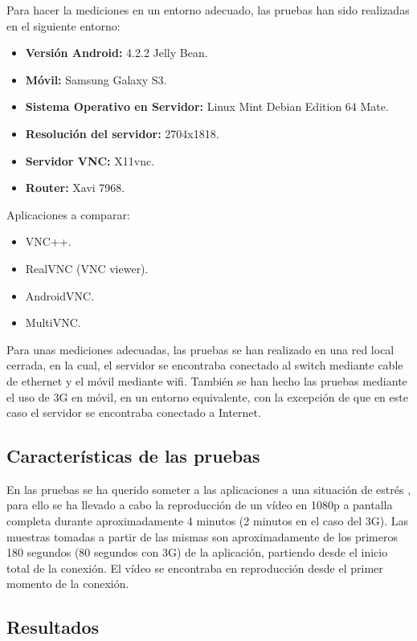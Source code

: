 Para hacer la mediciones en un entorno adecuado, las pruebas han sido realizadas en el siguiente entorno:
\begin{itemize}
\item \textbf{Versión Android:} 4.2.2 Jelly Bean.
\item \textbf{Móvil:} Samsung Galaxy S3.
\item \textbf{Sistema Operativo en Servidor:} Linux Mint Debian Edition 64 Mate.
\item \textbf{Resolución del servidor:} 2704x1818.
\item \textbf{Servidor VNC:} X11vnc.
\item \textbf{Router:} Xavi 7968.
\end{itemize}

Aplicaciones a comparar:
\begin{itemize}
\item VNC++.
\item RealVNC (VNC viewer).
\item AndroidVNC.
\item MultiVNC.
\end{itemize}

Para unas mediciones adecuadas, las pruebas se han realizado en una red local cerrada, en la cual, el servidor se encontraba conectado al switch mediante cable de ethernet y el móvil mediante wifi. También se han hecho las pruebas mediante el uso de 3G en móvil, en un entorno equivalente, con la excepción de que en este caso el servidor se encontraba conectado a Internet.

\subsection{Características de las pruebas}

En las pruebas se ha querido someter a las aplicaciones a una situación de estrés , para ello se ha llevado a cabo la reproducción de un vídeo en 1080p a pantalla completa durante aproximadamente 4 minutos (2 minutos en el caso del 3G). Las muestras tomadas a partir de las mismas son aproximadamente de los primeros 180 segundos (80 segundos con 3G) de la aplicación, partiendo desde el inicio total de la conexión. El vídeo se encontraba en reproducción desde el primer momento de la conexión.

\subsection{Resultados}


